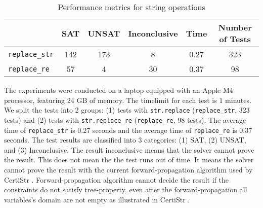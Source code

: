 \documentclass[a4paper,UKenglish,cleveref, autoref, anonymous, thm-restate]{lipics-v2021}
\begin{document}



\begin{table}[h]
  \centering
  \begin{tabular}{lccccc}
      \toprule
      & \textbf{SAT} & \textbf{UNSAT} & \textbf{Inconclusive} & \textbf{Time} & \textbf{Number of Tests} \\
      \midrule
      \texttt{replace\_str} & 142 & 173 & 8 & 0.27 & 323\\
      \texttt{replace\_re} & 57 & 4 & 30 & 0.37 & 98\\
      \bottomrule
  \end{tabular}
  \caption{Performance metrics for string operations}
  \label{tab:string_operations}
\end{table}

The experiments were conducted on a laptop equipped with an Apple M4 processor, featuring 24 GB of memory. The timelimit for each test is $1$ minutes. We split the tests into 2 groups: (1) tests with \texttt{str.replace} (\texttt{replace\_str}, 323 tests) and (2) tests with \texttt{str.replace\_re} (\texttt{replace\_re}, 98 tests). The average time of \texttt{replace\_str} is 0.27 seconds and the average time of \texttt{replace\_re} is 0.37 seconds. The test results are classified into 3 categories: (1) SAT, (2) UNSAT, and (3) Inconclusive.
The result inconclusive means that the solver cannot prove the result. This does not mean the the test runs out of time. It means the solver cannot prove the result with the current forward-propagation algorithm used by CertiStr \cite{cpp/KanLRS22}. Forward-propagation algorithm cannot decide the result if the constraints do not satisfy tree-property, even after the forward-propagation all variables's domain are not empty as illustrated in CertiStr \cite{cpp/KanLRS22}.
\end{document}
